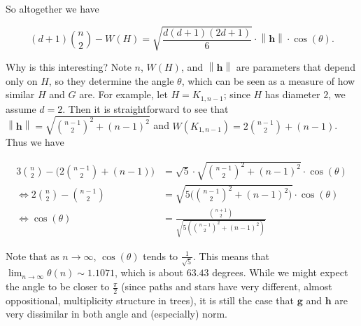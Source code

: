 \documentclass[12]{article}
\newcommand{\R}{\mathbb{R}}
\newcommand{\norm}[1]{\left\lVert #1 \right\rVert}
\theoremstyle{definition}
\begin{document}
	So altogether we have
	
	$$(d+1){n \choose 2} - W(H) = \sqrt{\frac{d(d+1)(2d+1)}{6}} \cdot \norm{\mathbf{h}} \cdot \cos(\theta).$$
	
	Why is this interesting?  Note $n$, $W(H)$, and $\norm{\mathbf{h}}$ are parameters that depend only on $H$, so they determine the angle $\theta$, which can be seen as a measure of how similar $H$ and $G$ are.  For example, let $H = K_{1,n-1}$; since $H$ has diameter $2$, we assume $d=2$.  Then it is straightforward to see that $\norm{\mathbf{h}} = \sqrt{{n-1 \choose 2}^2 + (n-1)^2}$ and $W(K_{1,n-1}) = 2{n-1 \choose 2} + (n-1)$.  Thus we have
	
	\begin{align*}
		3{n \choose 2} - \biggr(2{n-1 \choose 2} + (n-1)\biggr) &= \sqrt{5} \cdot \sqrt{{n-1 \choose 2}^2 + (n-1)^2} \cdot \cos(\theta)	\\
		\Leftrightarrow 2 {n \choose 2} - {n-1 \choose 2} &= \sqrt{5 \biggr({n-1 \choose 2}^2 + (n-1)^2\biggr)} \cdot \cos(\theta)	\\
		\Leftrightarrow \cos(\theta) &= \frac{{n+1 \choose 2}}{\sqrt{5({n-1 \choose 2}^2 + (n-1)^2)}}
	\end{align*}
	
	Note that as $n \rightarrow \infty$, $\cos(\theta)$ tends to $\tfrac{1}{\sqrt{5}}$.  This means that $\lim_{n \rightarrow \infty} \theta(n) \sim 1.1071$, which is about $63.43$ degrees.  While we might expect the angle to be closer to $\tfrac{\pi}{2}$ (since paths and stars have very different, almost oppositional, multiplicity structure in trees), it is still the case that $\mathbf{g}$ and $\mathbf{h}$ are very dissimilar in both angle and (especially) norm.
	
	
	
\end{document}
